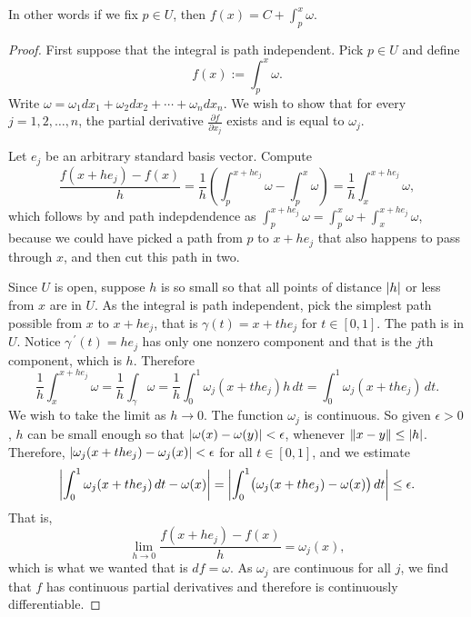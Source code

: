In other words if we fix $p \in U$, then $f(x) = C + \int_{p}^x \omega$.

\begin{proof}
First suppose that the integral is path independent.  Pick $p \in U$
and define
\begin{equation*}
f(x) := \int_{p}^x \omega .
\end{equation*}
Write $\omega = \omega_1 dx_1 + \omega_2 dx_2 + \cdots + \omega_n dx_n$.
We wish to show that for every $j = 1,2,\ldots,n$, the
partial derivative $\frac{\partial f}{\partial x_j}$ exists
and is equal to $\omega_j$.

Let $e_j$ be an arbitrary standard basis vector.  Compute
\begin{equation*}
\frac{f(x+h e_j) - f(x)}{h} =
\frac{1}{h} \left( \int_{p}^{x+he_j} \omega - \int_{p}^x \omega \right)
=
\frac{1}{h} \int_{x}^{x+he_j} \omega ,
\end{equation*}
which follows by  and path indepdendence as 
$\int_{p}^{x+he_j} \omega =
\int_{p}^{x} \omega +
\int_{x}^{x+he_j} \omega$, because we could have picked a path from $p$ to
$x+he_j$ that also happens to pass through $x$, and then cut this path in
two.


Since $U$ is open, suppose $h$ is so small so that all points of distance
$\left\lvert {h} \right\rvert$ or
less from $x$ are in $U$.
As the integral is path independent,
pick the simplest path possible from $x$ to $x+he_j$, that is
$\gamma(t) = x+t he_j$ for $t \in [0,1]$.  The path is in $U$.
Notice $\gamma^{\:\prime}(t) = h e_j$
has only one nonzero component and that is the $j$th component, which is
$h$.  Therefore
\begin{equation*}
\frac{1}{h} \int_{x}^{x+he_j} \omega 
=
\frac{1}{h} \int_{\gamma} \omega 
=
\frac{1}{h} \int_0^1 \omega_j(x+the_j) h \, dt 
=
\int_0^1 \omega_j(x+the_j) \, dt  .
\end{equation*}
We wish to take the limit as $h \to 0$.  The function $\omega_j$ is
continuous.  So given $\epsilon > 0$, $h$ can be small enough so that
$\left\lvert {\omega(x)-\omega(y)} \right\rvert < \epsilon$, whenever $\lVert {x-y} \rVert \leq \left\lvert {h} \right\rvert$.
Therefore,
$\left\lvert {\omega_j(x+the_j)-\omega_j(x)} \right\rvert < \epsilon$ for all $t \in [0,1]$,
and we estimate
\begin{equation*}
\left\lvert {\int_0^1 \omega_j(x+the_j) \, dt  - \omega(x)} \right\rvert
=
\left\lvert {\int_0^1 \bigl( \omega_j(x+the_j) - \omega(x) \bigr) \, dt} \right\rvert
\leq
\epsilon .
\end{equation*}
That is,
\begin{equation*}
\lim_{h\to 0}\frac{f(x+h e_j) - f(x)}{h} = \omega_j(x) ,
\end{equation*}
which is what we wanted that is $df = \omega$.  As $\omega_j$ are
continuous for all $j$, we find that $f$ has continuous partial derivatives and
therefore is continuously differentiable.


\end{proof}
